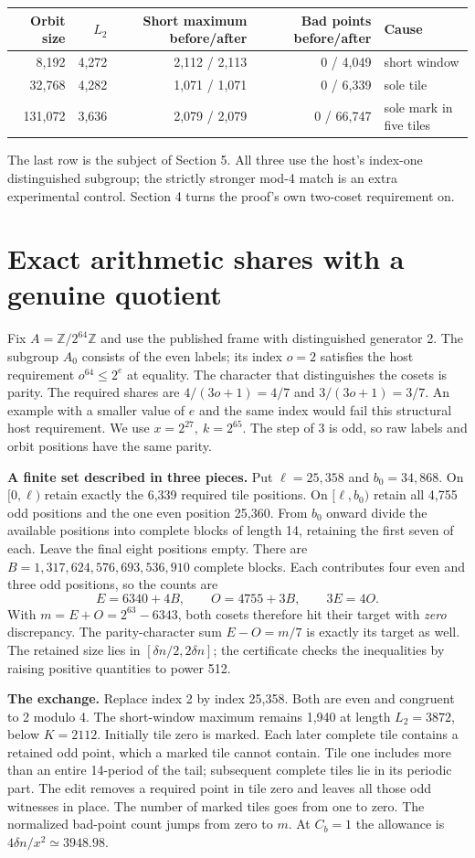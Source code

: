 \documentclass[11pt,letterpaper]{article}
\newcommand{\pp}[1]{\par\medskip\noindent\textbf{#1}\enspace}
\newcommand{\nextsection}[1]{\clearpage\section{#1}}
\begin{document}
\begin{center}\small
\begin{tabular}{@{}rrrrl@{}}\toprule
Orbit size & \(L_2\) & Short maximum before/after & Bad points before/after & Cause\\\midrule
8,192 & 4,272 & 2,112 / 2,113 & 0 / 4,049 & short window\\
32,768 & 4,282 & 1,071 / 1,071 & 0 / 6,339 & sole tile\\
131,072 & 3,636 & 2,079 / 2,079 & 0 / 66,747 & sole mark in five tiles\\\bottomrule
\end{tabular}
\end{center}
The last row is the subject of Section 5. All three use the host's index-one distinguished subgroup; the strictly stronger mod-4 match is an extra experimental control. Section 4 turns the proof's own two-coset requirement on.

\nextsection{Exact arithmetic shares with a genuine quotient}
Fix \(A=\mathbb Z/2^{64}\mathbb Z\) and use the published frame with distinguished generator 2. The subgroup \(A_0\) consists of the even labels; its index \(o=2\) satisfies the host requirement \(o^{64}\le 2^e\) at equality. The character that distinguishes the cosets is parity. The required shares are \(4/(3o+1)=4/7\) and \(3/(3o+1)=3/7\). An example with a smaller value of \(e\) and the same index would fail this structural host requirement. We use \(x=2^{27},\ k=2^{65}\). The step of 3 is odd, so raw labels and orbit positions have the same parity.

\pp{A finite set described in three pieces.} Put \(\ell=25{,}358\) and \(b_0=34{,}868\). On \([0,\ell)\) retain exactly the 6,339 required tile positions. On \([\ell,b_0)\) retain all 4,755 odd positions and the one even position 25,360. From \(b_0\) onward divide the available positions into complete blocks of length 14, retaining the first seven of each. Leave the final eight positions empty. There are \(B=1{,}317{,}624{,}576{,}693{,}536{,}910\) complete blocks. Each contributes four even and three odd positions, so the counts are
\[
 E=6340+4B,\qquad O=4755+3B,\qquad 3E=4O.
\]
With \(m=E+O=2^{63}-6343\), both cosets therefore hit their target with \emph{zero} discrepancy. The parity-character sum \(E-O=m/7\) is exactly its target as well. The retained size lies in \([\delta n/2,2\delta n]\); the certificate checks the inequalities by raising positive quantities to power 512.

\pp{The exchange.} Replace index 2 by index 25,358. Both are even and congruent to 2 modulo 4. The short-window maximum remains 1,940 at length \(L_2=3872\), below \(K=2112\). Initially tile zero is marked. Each later complete tile contains a retained odd point, which a marked tile cannot contain. Tile one includes more than an entire 14-period of the tail; subsequent complete tiles lie in its periodic part. The edit removes a required point in tile zero and leaves all those odd witnesses in place. The number of marked tiles goes from one to zero. The normalized bad-point count jumps from zero to \(m\). At \(C_b=1\) the allowance is \(4\delta n/x^2\simeq3948.98\).
\end{document}
